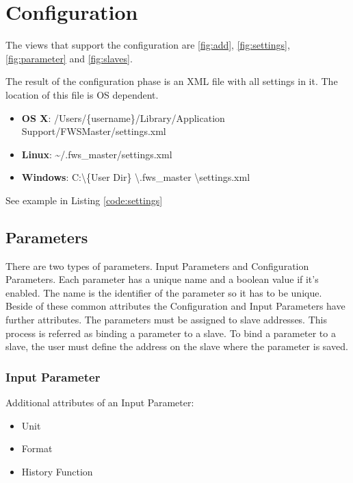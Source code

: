 \section{Configuration} %
\label{sec:configuration} 
The views that support the configuration are \ref{fig:add}, \ref{fig:settings}, \ref{fig:parameter} and \ref{fig:slaves}.

The result of the configuration phase is an XML file with all settings in it. The location of this file is OS dependent. 
\begin{itemize}
    \item \textbf{OS X}: /Users/\{username\}/Library/Application Support/FWSMaster/settings.xml
    \item \textbf{Linux}: \textasciitilde /.fws\_master/settings.xml
    \item \textbf{Windows}: C:\textbackslash \{User Dir\} \textbackslash .fws\_master \textbackslash settings.xml
\end{itemize}

See example in Listing \ref{code:settings}

{\C  }

\subsection{Parameters} %
\label{sub:parameters}
There are two types of parameters. Input Parameters and Configuration Parameters. Each parameter has a unique name and a boolean value if it's enabled. The name is the identifier of the parameter so it has to be unique. Beside of these common attributes the Configuration and Input Parameters have further attributes. The parameters must be assigned to slave addresses. This process is referred as binding a parameter to a slave. To bind a parameter to a slave, the user must define the address on the slave where the parameter is saved.

\subsubsection{Input Parameter} %
\label{ssub:input_parameter}
Additional attributes of an Input Parameter:
\begin{itemize}
	\item Unit
	\item Format
	\item History Function
\end{itemize}

